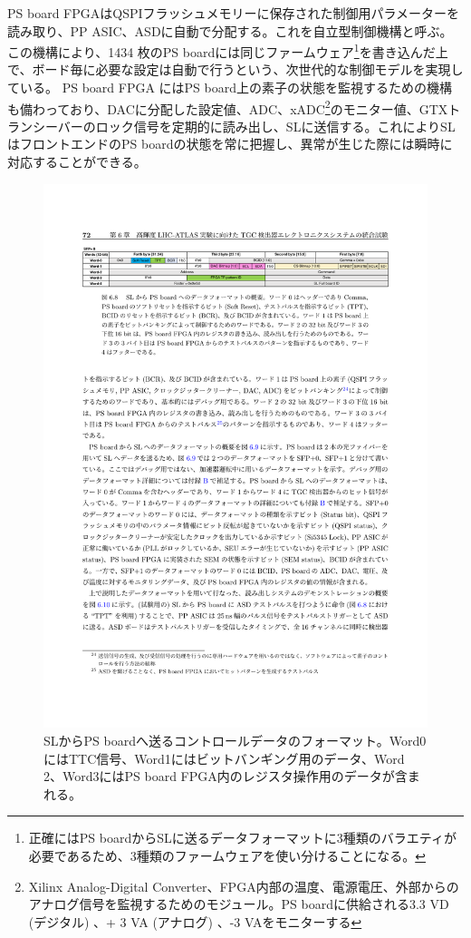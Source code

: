     PS board FPGAはQSPIフラッシュメモリーに保存された制御用パラメーターを読み取り、PP ASIC、ASDに自動で分配する。これを自立型制御機構と呼ぶ。この機構により、1434 枚のPS boardには同じファームウェア\footnote{正確にはPS boardからSLに送るデータフォーマットに3種類のバラエティが必要であるため、3種類のファームウェアを使い分けることになる。}を書き込んだ上で、ボード毎に必要な設定は自動で行うという、次世代的な制御モデルを実現している。
    PS board FPGA にはPS board上の素子の状態を監視するための機構も備わっており、DACに分配した設定値、ADC、xADC\footnote{Xilinx Analog-Digital Converter、FPGA内部の温度、電源電圧、外部からのアナログ信号を監視するためのモジュール。PS boardに供給される3.3 VD  (デジタル) 、+ 3 VA  (アナログ) 、-3 VAをモニターする}のモニター値、GTXトランシーバーのロック信号を定期的に読み出し、SLに送信する。これによりSLはフロントエンドのPS boardの状態を常に把握し、異常が生じた際には瞬時に対応することができる。

    \begin{figure} 
        \centering
        \includegraphics[width=16cm]{fig/Intro/TGC_PSBdownlink.pdf}
        \caption[SLからPS boardへ送るコントロールデータのフォーマット]{SLからPS boardへ送るコントロールデータのフォーマット\cite{mt_aoki}。Word0にはTTC信号、Word1にはビットバンギング用のデータ、Word 2、Word3にはPS board FPGA内のレジスタ操作用のデータが含まれる。}
        \label{TGC_PSBdownlink}
    \end{figure}
    
